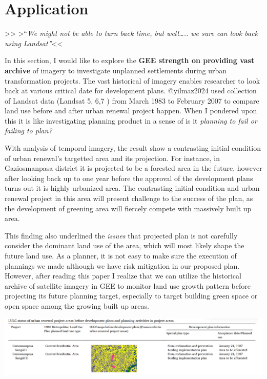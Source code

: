\documentclass[
  letterpaper,
  DIV=11,
  numbers=noendperiod]{scrreprt}
\begin{document}
\hypertarget{application-3}{%
\section{Application}\label{application-3}}

\textgreater\textgreater{} \textgreater``\emph{We might not be able to
turn back time, but well\ldots.. we sure can look back using
Landsat''}\textless\textless{}

In this section, I would like to explore the \textbf{GEE strength on
providing vast archive} of imagery to investigate unplanned settlements
during urban transformation projects. The vast historical of imagery
enables researcher to look back at various critical date for development
plans. @yilmaz2024 used collection of Landsat data (Landsat 5, 6,7 )
from March 1983 to February 2007 to compare land use before and after
urban renewal project happen. When I pondered upon this it is like
investigating planning product in a sense of is it \emph{planning to
fail or failing to plan?}

With analysis of temporal imagery, the result show a contrasting initial
condition of urban renewal's targetted area and its projection. For
instance, in Gaziosmanpasa district it is projected to be a forested
area in the future, however after looking back up to one year before the
approval of the development plans turns out it is highly urbanized area.
The contrasting initial condition and urban renewal project in this area
will present challenge to the success of the plan, as the development of
greening area will fiercely compete with massively built up area.

This finding also underlined the \emph{issues} that projected plan is
not carefully consider the dominant land use of the area, which will
most likely shape the future land use. As a planner, it is not easy to
make sure the execution of plannings we made although we have risk
mitigation in our proposed plan. However, after reading this paper I
realize that we can utilize the historical archive of satellite imagery
in GEE to monitor land use growth pattern before projecting its future
planning target, especially to target building green space or open space
among the growing built up areas.

\includegraphics[width=7.58333in,height=\textheight]{images/clipboard-3598015637.png}
\end{document}
